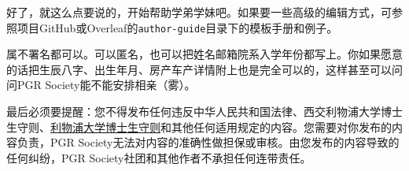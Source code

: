 \vspace{5mm}
好了，就这么点要说的，开始帮助学弟学妹吧。如果要一些高级的编辑方式，可参照项目GitHub或Overleaf的\texttt{author-guide}目录下的模板手册和例子。

属不署名都可以。可以匿名，也可以把姓名邮箱院系入学年份都写上。你如果愿意的话把生辰八字、出生年月、房产车产详情附上也是完全可以的，这样甚至可以问问PGR Society能不能安排相亲（雾）。

最后必须要提醒：您不得发布任何违反中华人民共和国法律、西交利物浦大学博士生守则、\href{https://www.liverpool.ac.uk/aqsd/academic-codes-of-practice/pgr-code-of-practice/}{利物浦大学博士生守则}和其他任何适用规定的内容。您需要对你发布的内容负责，PGR Society无法对内容的准确性做担保或审核。由您发布的内容导致的任何纠纷，PGR Society社团和其他作者不承担任何连带责任。